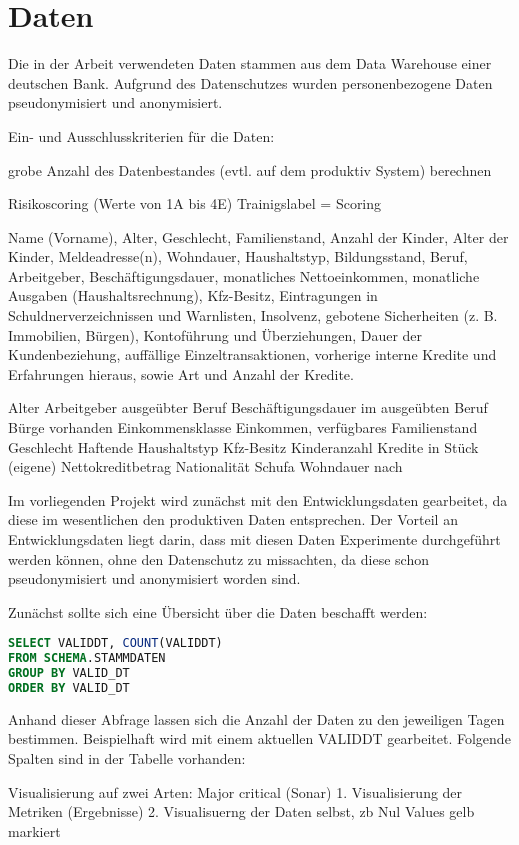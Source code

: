 \chapter{Daten}\label{ch:data}

Die in der Arbeit verwendeten Daten stammen aus dem Data Warehouse einer deutschen Bank.
Aufgrund des Datenschutzes wurden personenbezogene Daten pseudonymisiert und anonymisiert.

Ein- und Ausschlusskriterien für die Daten:



grobe Anzahl des Datenbestandes (evtl. auf dem produktiv System) berechnen


Risikoscoring (Werte von 1A bis 4E)
Trainigslabel = Scoring


 Name (Vorname), Alter, Geschlecht, Familienstand, Anzahl der Kinder,
Alter der Kinder, Meldeadresse(n), Wohndauer, Haushaltstyp, Bildungsstand, Beruf, Arbeitgeber, Beschäftigungsdauer, monatliches Nettoeinkommen, monatliche Ausgaben (Haushaltsrechnung), Kfz-Besitz, Eintragungen in Schuldnerverzeichnissen und Warnlisten, Insolvenz, gebotene Sicherheiten (z. B. Immobilien, Bürgen), Kontoführung und Überziehungen, Dauer der Kundenbeziehung, auffällige Einzeltransaktionen, vorherige interne
Kredite und Erfahrungen hieraus, sowie Art und Anzahl der Kredite. 



Alter
Arbeitgeber
ausgeübter Beruf
Beschäftigungsdauer im ausgeübten Beruf
Bürge vorhanden
Einkommensklasse
Einkommen, verfügbares
Familienstand
Geschlecht
Haftende
Haushaltstyp
Kfz-Besitz
Kinderanzahl
Kredite in Stück (eigene)
Nettokreditbetrag
Nationalität
Schufa
Wohndauer
nach 
\cite{sokol2005}


Im vorliegenden Projekt wird zunächst mit den Entwicklungsdaten gearbeitet, da diese im wesentlichen den produktiven Daten entsprechen.
Der Vorteil an Entwicklungsdaten liegt darin, dass mit diesen Daten Experimente durchgeführt werden können, ohne den Datenschutz zu missachten, da diese schon pseudonymisiert und anonymisiert worden sind. 

Zunächst sollte sich eine Übersicht über die Daten beschafft werden:


\begin{lstlisting}[language=SQL,caption={Überblick über die Daten},captionpos=b]
SELECT VALIDDT, COUNT(VALIDDT) 
FROM SCHEMA.STAMMDATEN 
GROUP BY VALID_DT 
ORDER BY VALID_DT
\end{lstlisting}
Anhand dieser Abfrage lassen sich die Anzahl der Daten zu den jeweiligen Tagen bestimmen. 
Beispielhaft wird mit einem aktuellen VALIDDT gearbeitet. 
Folgende Spalten sind in der Tabelle vorhanden:






Visualisierung auf zwei Arten: Major critical (Sonar)
1. Visualisierung der Metriken (Ergebnisse)
2. Visualisuerng der Daten selbst, zb Nul Values gelb markiert
